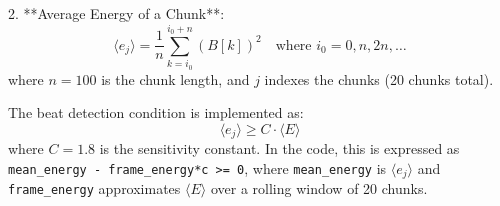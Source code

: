 \documentclass{article}
\begin{document}
2. **Average Energy of a Chunk**:
   \begin{equation}
   \langle e_j \rangle = \frac{1}{n} \sum_{k=i_0}^{i_0+n} (B[k])^2 \quad \text{where } i_0 = 0, n, 2n, \dots
   \end{equation}
   where $n=100$ is the chunk length, and $j$ indexes the chunks (20 chunks total).

The beat detection condition is implemented as:
\begin{equation}
\langle e_j \rangle \geq C \cdot \langle E \rangle
\end{equation}
where $C=1.8$ is the sensitivity constant. In the code, this is expressed as \texttt{mean\_energy - frame\_energy*c >= 0}, where \texttt{mean\_energy} is $\langle e_j \rangle$ and \texttt{frame\_energy} approximates $\langle E \rangle$ over a rolling window of 20 chunks.
\end{document}
